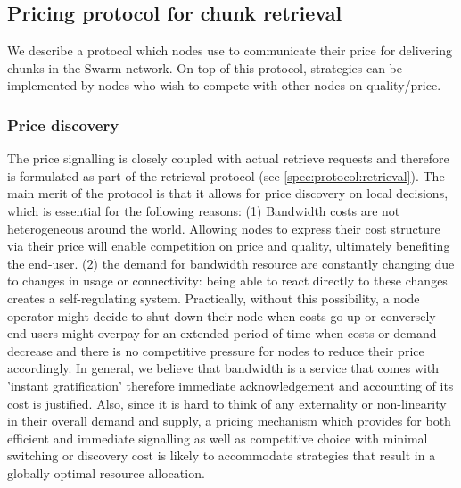 \subsection{Pricing protocol for chunk retrieval}\label{sec:pricing}

We describe a protocol which nodes use to communicate their price for delivering chunks in the Swarm network. On top of this protocol, strategies can be implemented by nodes who wish to compete with other nodes on quality/price. 

\subsubsection{Price discovery}

The price signalling is closely coupled with actual retrieve requests and therefore is formulated as part of the retrieval protocol (see \ref{spec:protocol:retrieval}). The main merit of the protocol is that it allows for price discovery on local decisions, which is essential for the following reasons: (1) Bandwidth costs are not heterogeneous around the world. Allowing nodes to express their cost structure via their price will enable competition on price and quality, ultimately benefiting the end-user. (2) the demand for bandwidth resource are constantly changing due to changes in usage or connectivity: being able to react directly to these changes creates a self-regulating system. Practically, without this possibility, a node operator might decide to shut down their node when costs go up or conversely end-users might overpay for an extended period of time when costs or demand decrease and there is no competitive pressure for nodes to reduce their price accordingly. In general, we believe that bandwidth is a service that comes with 'instant gratification' therefore immediate acknowledgement and accounting of its cost is justified. Also, since it is hard to think of any externality or non-linearity in their overall demand and supply, a pricing mechanism which provides for both efficient and immediate signalling as well as competitive choice with minimal switching or discovery cost is likely to accommodate strategies that result in a globally optimal resource allocation.

